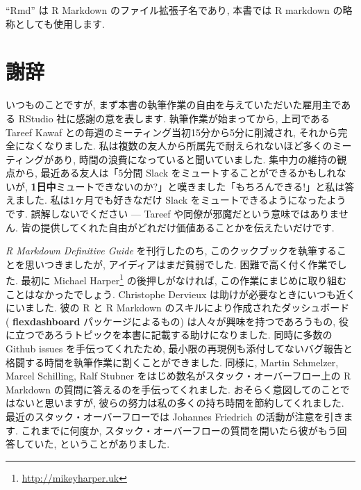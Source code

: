 \documentclass[
  11pt,
  lualatex,
  ja=standard]{bxjsreport}
\renewcommand{\href}[2]{#2\footnote{\url{#1}}}
\begin{document}
``Rmd'' は R Markdown のファイル拡張子名であり, 本書では R markdown の略称としても使用します.

\hypertarget{acknowledgments}{%
\section*{謝辞}\label{acknowledgments}}

いつものことですが, まず本書の執筆作業の自由を与えていただいた雇用主である RStudio 社に感謝の意を表します. 執筆作業が始まってから, 上司である Tareef Kawaf との毎週のミーティング当初15分から5分に削減され, それから完全になくなりました. 私は複数の友人から所属先で耐えられないほど多くのミーティングがあり, 時間の浪費になっていると聞いていました. 集中力の維持の観点から, 最近ある友人は「5分間 Slack をミュートすることができるかもしれないが, \textbf{1日中}ミュートできないのか?」と嘆きました「もちろんできる!」と私は答えました. 私は1ヶ月でも好きなだけ Slack をミュートできるようになったようです. 誤解しないでください --- Tareef や同僚が邪魔だという意味ではありません. 皆の提供してくれた自由がどれだけ価値あることかを伝えたいだけです.

\emph{R Markdown Definitive Guide} を刊行したのち, このクックブックを執筆することを思いつきましたが, アイディアはまだ貧弱でした. 困難で高く付く作業でした. 最初に \href{http://mikeyharper.uk}{Michael Harper} の後押しがなければ, この作業にまじめに取り組むことはなかったでしょう. Christophe Dervieux は助けが必要なときにいつも近くにいました. 彼の R と R Markdown のスキルにより作成されたダッシュボード ( \textbf{flexdashboard} パッケージによるもの) は人々が興味を持つであろうもの, 役に立つであろうトピックを本書に記載する助けになりました. 同時に多数の Github issues を手伝ってくれたため, 最小限の再現例も添付してないバグ報告と格闘する時間を執筆作業に割くことができました. 同様に, Martin Schmelzer, Marcel Schilling, Ralf Stubner をはじめ数名がスタック・オーバーフロー上の R Markdown の質問に答えるのを手伝ってくれました. おそらく意図してのことではないと思いますが, 彼らの努力は私の多くの持ち時間を節約してくれました. 最近のスタック・オーバーフローでは Johannes Friedrich の活動が注意を引きます. これまでに何度か, スタック・オーバーフローの質問を開いたら彼がもう回答していた, ということがありました.
\end{document}

